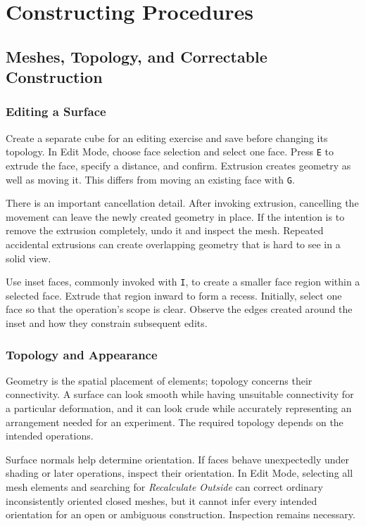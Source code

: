 \documentclass[11pt,openany]{book}
\newcommand{\key}[1]{\texttt{#1}}
\begin{document}
\part{Constructing Procedures}

\chapter{Meshes, Topology, and Correctable Construction}

\section{Editing a Surface}

Create a separate cube for an editing exercise and save before changing its topology. In Edit Mode, choose face selection and select one face. Press \key{E} to extrude the face, specify a distance, and confirm. Extrusion creates geometry as well as moving it. This differs from moving an existing face with \key{G}.

There is an important cancellation detail. After invoking extrusion, cancelling the movement can leave the newly created geometry in place. If the intention is to remove the extrusion completely, undo it and inspect the mesh. Repeated accidental extrusions can create overlapping geometry that is hard to see in a solid view.

Use inset faces, commonly invoked with \key{I}, to create a smaller face region within a selected face. Extrude that region inward to form a recess. Initially, select one face so that the operation's scope is clear. Observe the edges created around the inset and how they constrain subsequent edits.

\section{Topology and Appearance}

Geometry is the spatial placement of elements; topology concerns their connectivity. A surface can look smooth while having unsuitable connectivity for a particular deformation, and it can look crude while accurately representing an arrangement needed for an experiment. The required topology depends on the intended operations.

Surface normals help determine orientation. If faces behave unexpectedly under shading or later operations, inspect their orientation. In Edit Mode, selecting all mesh elements and searching for \emph{Recalculate Outside} can correct ordinary inconsistently oriented closed meshes, but it cannot infer every intended orientation for an open or ambiguous construction. Inspection remains necessary.
\end{document}
